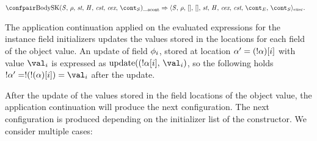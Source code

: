 \documentclass[a4paper,oneside,fleqn]{article}
\DeclareMathOperator{\update}{update}
\newcommand{\cesktrans}[2]{\ensuremath{{#1} \Rightarrow {#2}}}
\begin{document}
\begin{align*}
    &\cesktrans%
        {\scontconf{\BodySK{\stmt}{\env}{\scont}}{\_}}%
        {\execconf{\stmt}{\env}{[]}{[]}{\strace}{\handler}{\cex,\,\cstrace}{\econt}{\scont}}.
\end{align*}

The application continuation applied on the evaluated expressions for the instance field initializers updates the values stored in the locations for each field  of the object value.
An update of field $\phi_i$, stored at location $\alpha' = (!\alpha)[i]$ with value $\val_i$ is expressed as $\update((\deref{\loc}[i],\, \val_{i})$, so the following holds $\deref{\loc'} = \deref{(\deref{(\loc)}[i])} = \val_{i}$ after the update.

After the update of the values stored in the field locations of the object value, the application continuation will produce the next configuration.
The next configuration is produced depending on the initializer list of the constructor.
We consider multiple cases:
\end{document}
